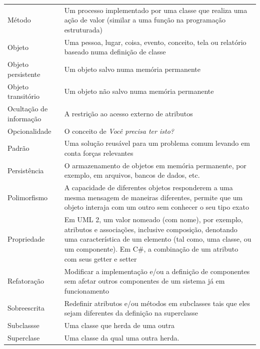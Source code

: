 \documentclass[
	article,			%
	12pt,				%
	openright,
	twoside,			%
	a4paper,			%
	english,			%
	french,
	brazil,				%
	sumario=tradicional
	]{abntex2}
\begin{document}
\begin{longtable}[l]{p{4.6cm}p{11.1cm}}
Método & Um processo implementado por uma classe que realiza uma ação de valor (similar a uma função na programação estruturada)\\

Objeto & Uma pessoa, lugar, coisa, evento, conceito, tela ou relatório baseado numa definição de classe\\

Objeto persistente & Um objeto salvo numa memória permanente\\

Objeto transitório & Um objeto não salvo numa memória permanente\\

Ocultação de informação & A restrição ao acesso externo de atributos\\

Opcionalidade & O conceito de \emph{Você precisa ter isto?}\\

Padrão & Uma solução reusável para um problema comum levando em conta forças relevantes\\

Persistência & O armazenamento de objetos em memória permanente, por exemplo, em arquivos, bancos de dados, etc.\\

Polimorfismo & A capacidade de diferentes objetos responderem a uma mesma mensagem de maneiras diferentes, permite que um objeto interaja com um outro sem conhecer o seu tipo exato\\

Propriedade & Em UML 2, um valor nomeado (com nome), por exemplo, atributos e associações, inclusive composição, denotando uma característica de um elemento (tal como, uma classe, ou um componente). Em C\#, a combinação de um atributo com seus getter e setter \\

Refatoração & Modificar a implementação e/ou a definição de componentes sem afetar outros componentes de um sistema já em funcionamento\\

Sobreescrita & Redefinir atributos e/ou métodos em subclasses tais que eles sejam diferentes da definição na superclasse\\

Subclassse & Uma classe que herda de uma outra\\

Superclase & Uma classe da qual uma outra herda.\\

\end{longtable}
\end{document}
